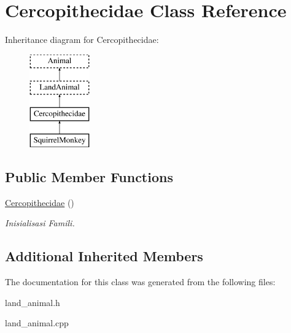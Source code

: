 \hypertarget{class_cercopithecidae}{}\section{Cercopithecidae Class Reference}
\label{class_cercopithecidae}
Inheritance diagram for Cercopithecidae\+:\begin{figure}[H]
\begin{center}
\leavevmode
\includegraphics[height=4.000000cm]{class_cercopithecidae}
\end{center}
\end{figure}
\subsection*{Public Member Functions}
\begin{DoxyCompactItemize}
\item 
\hyperlink{class_cercopithecidae_a9ca501b8f8d089d1170ed9a479deaa2b}{Cercopithecidae} ()\hypertarget{class_cercopithecidae_a9ca501b8f8d089d1170ed9a479deaa2b}{}\label{class_cercopithecidae_a9ca501b8f8d089d1170ed9a479deaa2b}

\begin{DoxyCompactList}\small\item\em Inisialisasi Famili. \end{DoxyCompactList}\end{DoxyCompactItemize}
\subsection*{Additional Inherited Members}


The documentation for this class was generated from the following files\+:\begin{DoxyCompactItemize}
\item 
land\+\_\+animal.\+h\item 
land\+\_\+animal.\+cpp\end{DoxyCompactItemize}
